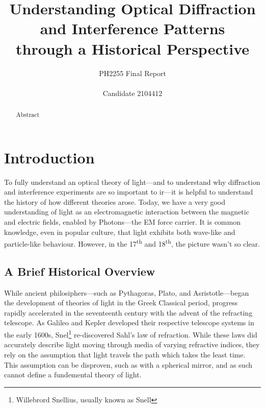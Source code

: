 \documentclass[a4paper]{article}
\title{%
  Understanding Optical Diffraction and Interference Patterns \\through a Historical Perspective}
\author{PH2255 Final Report\\ \\Candidate 2104412}
\begin{document}
\maketitle

\begin{abstract}
Abstract
\end{abstract}
\clearpage
\tableofcontents
\clearpage
\section{Introduction} \label{sec:intro}
To fully understand an optical theory of light---and to understand why diffraction and interference experiments are so important to ir---it is helpful to understand the history of how different theories arose. Today, we have a very good understanding of light as an electromagnetic interaction between the magnetic and electric fields, enabled by Photons---the EM force carrier. It is common knowledge, even in popular culture, that light exhibits both wave-like and particle-like behaviour. However, in the 17\textsuperscript{th} and 18\textsuperscript{th}, the picture wasn't so clear.\cite[\S1.3]{RefWorks:doc:60689ea38f08cf86c9dc700e}

\subsection{A Brief Historical Overview} \label{sub:over}

While ancient philosiphers---such as Pythagoras, Plato, and Asristotle---began the development of theories of light in the Greek Classical period, progress rapidly accelerated in the seventeenth century with the advent of the refracting telescope. As Galileo and Kepler developed their respective telescope systems in the early 1600s, Snel\footnote{Willebrord Snellius, usually known as Snell} re-discovered Sahl's law of refraction. While these laws did accurately describe light moving through media of varying refractive indices, they rely on the assumption that light travels the path which takes the least time. This assumption can be disproven, such as with a spherical mirror, and as such cannot define a fundemental theory of light.
\end{document}
